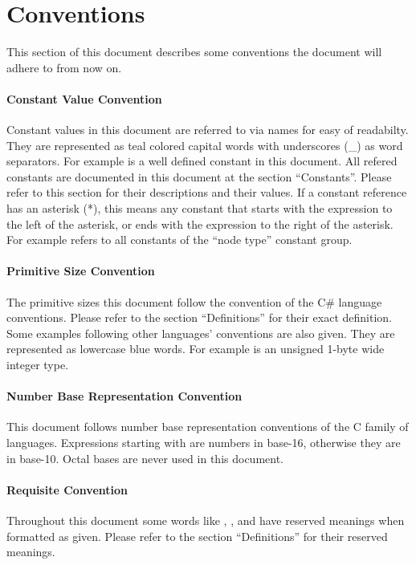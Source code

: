 \section {Conventions}
This section of this document describes some conventions the document will
adhere to from now on.

\paragraph{Constant Value Convention}
Constant values in this document are referred to via names for easy of 
readabilty. They are represented as teal colored capital words with underscores
(\_) as word separators. For example  is a well defined
constant in this document.
All refered constants are documented in this document at the section 
``Constants''. Please refer to this section for their descriptions and their 
values. If a constant reference has an asterisk (*), this means any constant
that starts with the expression to the left of the asterisk, or ends with the
expression to the right of the asterisk. For example  refers
to all constants of the ``node type'' constant group.

\paragraph{Primitive Size Convention}
The primitive sizes this document follow the convention of the C\# language 
conventions. Please refer to the section ``Definitions'' for their exact 
definition. Some examples following other languages' conventions are also
given. They are represented as lowercase blue words. For example 
is an unsigned 1-byte wide integer type.

\paragraph{Number Base Representation Convention}
This document follows number base representation conventions of the C family of
languages. Expressions starting with \hex{} are numbers in base-16, otherwise
they are in base-10. Octal bases are never used in this document.

\paragraph{Requisite Convention}
Throughout this document some words like \must, \should, and \may have reserved
meanings when formatted as given. Please refer to the section ``Definitions'' 
for their reserved meanings. 